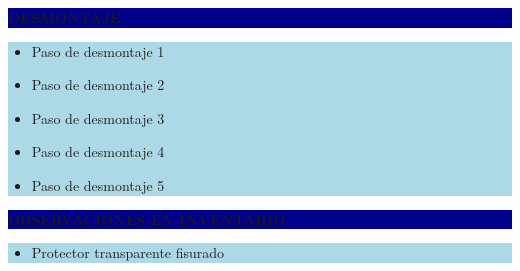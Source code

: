 \documentclass[11pt]{article}
\newcommand{\seccionbanda}[1]{%
  \vspace{0.6em}
  \noindent\colorbox{darkblue}{\parbox{\dimexpr\linewidth-2\fboxsep}{%
    \centering\color{white}\bfseries #1}}\par\vspace{0.6em}
}
\begin{document}
\seccionbanda{DESMONTAJE}
\noindent\colorbox{lightblue}{\parbox{\dimexpr\linewidth-2\fboxsep\relax}{%
\begin{itemize}[label=$\square$, itemsep=4pt]
\item Paso de desmontaje 1
\item Paso de desmontaje 2
\item Paso de desmontaje 3
\item Paso de desmontaje 4
\item Paso de desmontaje 5
\end{itemize}
}}\par
\seccionbanda{OBSERVACIONES EN INVENTARIO}
\noindent\colorbox{lightblue}{\parbox{\dimexpr\linewidth-2\fboxsep\relax}{\begin{itemize}[itemsep=4pt]
\item Protector transparente fisurado
\end{itemize}}}\par
\end{document}
